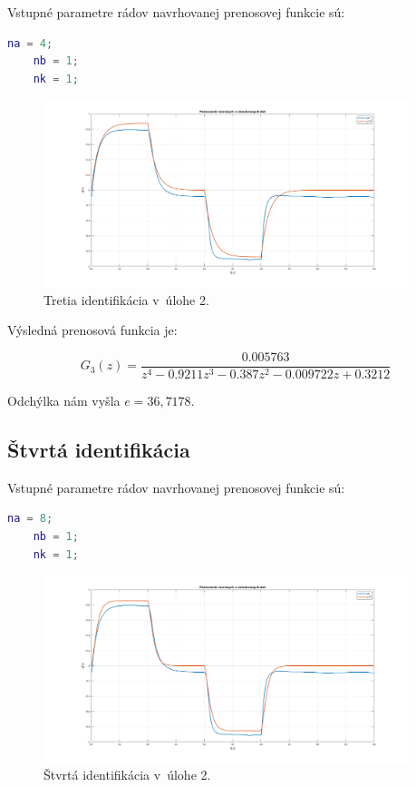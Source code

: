 \documentclass{article}
\begin{document}
Vstupné parametre rádov navrhovanej prenosovej funkcie sú:

\begin{lstlisting}[language=Matlab]
	na = 4;
	nb = 1;
	nk = 1;
\end{lstlisting}

\begin{figure}[!htbp]
	\begin{center}
		\includegraphics[width=0.95\textwidth]{include/I3.png}
	\end{center}
	\caption{Tretia identifikácia v~úlohe 2.}
	\label{fig:I3}
\end{figure}

Výsledná prenosová funkcia je:

\begin{equation}
	G_3(z) = \frac{0.005763}{z^4 - 0.9211 z^3 - 0.387 z^2 - 0.009722 z + 0.3212}
	\label{eq:I3}
\end{equation}

Odchýlka nám vyšla $e = 36,7178$.

\clearpage

\subsection{Štvrtá identifikácia}
\label{subsec:I4}

Vstupné parametre rádov navrhovanej prenosovej funkcie sú:

\begin{lstlisting}[language=Matlab]
	na = 8;
	nb = 1;
	nk = 1;
\end{lstlisting}

\begin{figure}[!htbp]
	\begin{center}
		\includegraphics[width=0.95\textwidth]{include/I4.png}
	\end{center}
	\caption{Štvrtá identifikácia v~úlohe 2.}
	\label{fig:I4}
\end{figure}
\end{document}
